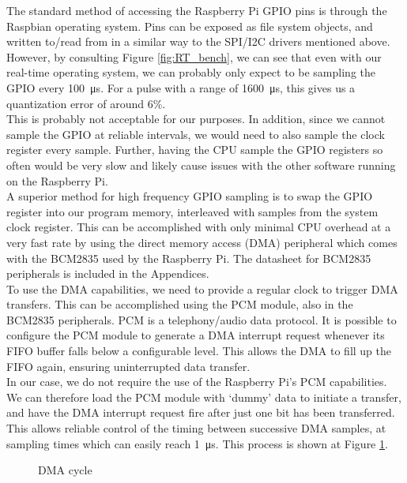\documentclass[capstone_report.tex]{subfiles}
\begin{document}
    The standard method of accessing the Raspberry Pi GPIO pins is through the Raspbian operating system. Pins can be exposed as file system objects, and written to/read from in a similar way to the SPI/I2C drivers mentioned above. However, by consulting Figure \ref{fig:RT_bench}, we can see that even with our real-time operating system, we can probably only expect to be sampling the GPIO every \SI{100}{\micro\second}. For a pulse with a range of \SI{1600}{\micro\second}, this gives us a quantization error of around 6\%. \\

    This is probably not acceptable for our purposes. In addition, since we cannot sample the GPIO at reliable intervals, we would need to also sample the clock register every sample. Further, having the CPU sample the GPIO registers so often would be very slow and likely cause issues with the other software running on the Raspberry Pi.\\

    A superior method for high frequency GPIO sampling is to swap the GPIO register into our program memory, interleaved with samples from the system clock register. This can be accomplished with only minimal CPU overhead at a very fast rate by using the direct memory access (DMA) peripheral which comes with the BCM2835 used by the Raspberry Pi. The datasheet for BCM2835 peripherals is included in the Appendices.\\

    To use the DMA capabilities, we need to provide a regular clock to trigger DMA transfers. This can be accomplished using the PCM module, also in the BCM2835 peripherals. PCM is a telephony/audio data protocol. It is possible to configure the PCM module to generate a DMA interrupt request whenever its FIFO buffer falls below a configurable level. This allows the DMA to fill up the FIFO again, ensuring uninterrupted data transfer. \\  

    In our case, we do not require the use of the Raspberry Pi's PCM capabilities. We can therefore load the PCM module with `dummy' data to initiate a transfer, and have the DMA interrupt request fire after just one bit has been transferred. This allows reliable control of the timing between successive DMA samples, at sampling times which can easily reach \SI{1}{\micro\second}. This process is shown at Figure \ref{fig:dma1}.


    \begin{figure}[H]
    \centering
        
        \caption{DMA cycle\label{fig:dma1}}
    \end{figure}
\end{document}
